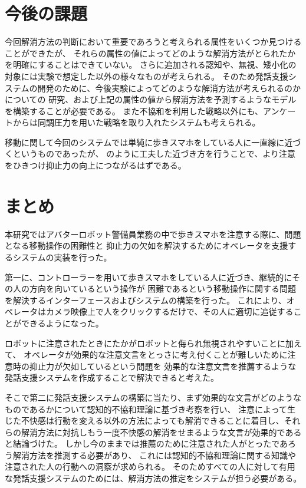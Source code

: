 \documentclass{kuisthesis}
\begin{document}
\section{今後の課題}
今回解消方法の判断において重要であろうと考えられる属性をいくつか見つけることができたが、
それらの属性の値によってどのような解消方法がとられたかを明確にすることはできていない。
さらに追加される認知や、無視、矮小化の対象には実験で想定した以外の様々なものが考えられる。
そのため発話支援システムの開発のために、今後実験によってどのような解消方法が考えられるのかについての
研究、および上記の属性の値から解消方法を予測するようなモデルを構築することが必要である。
また不協和を利用した戦略以外にも、アンケートからは同調圧力を用いた戦略を取り入れたシステムも考えられる。


移動に関して今回のシステムでは単純に歩きスマホをしている人に一直線に近づくというものであったが、
\cite{Mizumaru2019}のように工夫した近づき方を行うことで、より注意をひきつけ抑止力の向上につながるはずである。
\section{まとめ}
本研究ではアバターロボット警備員業務の中で歩きスマホを注意する際に、問題となる移動操作の困難性と
抑止力の欠如を解決するためにオペレータを支援するシステムの実装を行った。

第一に、コントローラーを用いて歩きスマホをしている人に近づき、継続的にその人の方向を向いているという操作が
困難であるという移動操作に関する問題を解決するインターフェースおよびシステムの構築を行った。
これにより、オペレータはカメラ映像上で人をクリックするだけで、その人に適切に追従することができるようになった。

ロボットに注意されたときにたかがロボットと侮られ無視されやすいことに加えて、
オペレータが効果的な注意文言をとっさに考え付くことが難しいために注意時の抑止力が欠如しているという問題を
効果的な注意文言を推薦するような発話支援システムを作成することで解決できると考えた。

そこで第二に発話支援システムの構築に当たり、まず効果的な文言がどのようなものであるかについて認知的不協和理論に基づき考察を行い、
注意によって生じた不快感は行動を変える以外の方法によっても解消できることに着目し、それらの解消方法に対抗しもう一度不快感の解消をせまるような文言が効果的であると結論づけた。
しかし今のままでは推薦のために注意された人がとったであろう解消方法を推測する必要があり、
これには認知的不協和理論に関する知識や注意された人の行動への洞察が求められる。
そのためすべての人に対して有用な発話支援システムのためには、解消方法の推定をシステムが担う必要がある。
\end{document}
